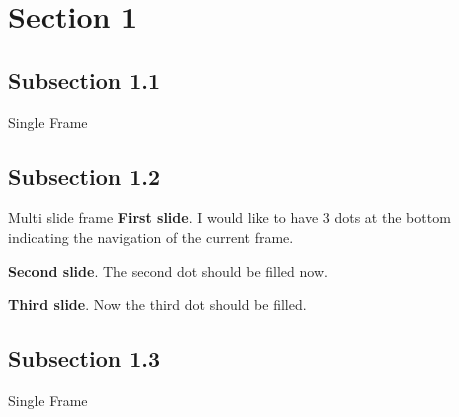 \documentclass[compress]{beamer}
\begin{document}
\section{Section 1}

\subsection{Subsection 1.1}

\begin{frame}{Single Frame}
\end{frame}

\subsection{Subsection 1.2}

\begin{frame}{Multi slide frame}
    \textbf{First slide}. I would like to have 3 dots at the bottom indicating the navigation of the current frame. \pause

    \textbf{Second slide}. The  second dot should be filled now.\pause

    \textbf{Third slide}. Now the third dot should be filled.
\end{frame}

\subsection{Subsection 1.3}

\begin{frame}{Single Frame}
\end{frame}
\end{document}
